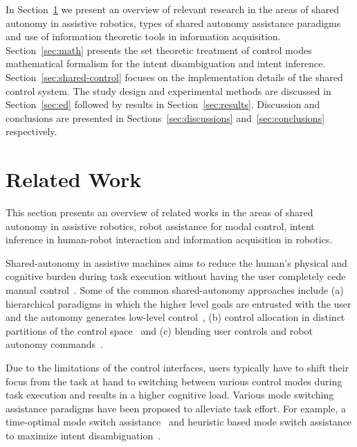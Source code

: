 \documentclass[conference]{IEEEtran}
\begin{document}
In Section~\ref{sec:related_work} we present an overview of relevant research in the areas of shared autonomy in assistive robotics, types of shared autonomy assistance paradigms and use of information theoretic tools in information acquisition. Section~\ref{sec:math} presents the set theoretic treatment of control modes mathematical formalism for the intent disambiguation and intent inference. Section~\ref{sec:shared-control} focuses on the implementation details of the shared control system. The study design and experimental methods are discussed in Section~\ref{sec:ed} followed by results in Section~\ref{sec:results}. Discussion and conclusions are presented in Sections~\ref{sec:discussions} and~\ref{sec:conclusions} respectively. 


\section{Related Work}\label{sec:related_work}
This section presents an overview of related works in the areas of shared autonomy in assistive robotics, robot assistance for modal control, intent inference in human-robot interaction and information acquisition in robotics. 

Shared-autonomy in assistive machines aims to reduce the human's physical and cognitive burden during task execution without having the user completely cede manual control~\citep{philips2007adaptive, demeester2008user}. Some of the common shared-autonomy approaches include (a) hierarchical paradigms in which the higher level goals are entrusted with the user and the autonomy generates low-level control~\citep{kim2012autonomy}, (b) control allocation in distinct partitions of the control space~\citep{driessen2005collaborative} and (c) blending user controls and robot autonomy commands~\citep{muelling2017autonomy}. 

Due to the limitations of the control interfaces, users typically have to shift their focus from the task at hand to switching between various control modes during task execution and results in a higher cognitive load. Various mode switching assistance paradigms have been proposed to alleviate task effort. For example, a time-optimal mode switch assistance~\citep{herlant2016assistive} and heuristic based mode switch assistance to maximize intent disambiguation~\citep{gopinath2017mode}. 
\end{document}
